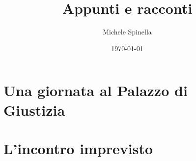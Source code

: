 \documentclass[a4,10pt,oneside,openany]{memoir}
\begin{document}
\title{Appunti e racconti}
\author{Michele Spinella}
\date{\today}
\maketitle

\chapter*{Una giornata al Palazzo di Giustizia}

\chapter*{L'incontro imprevisto}

\end{document}
